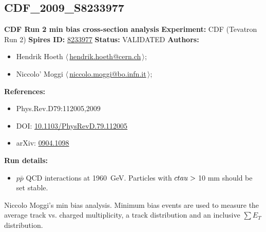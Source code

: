 \subsection[CDF\_2009\_S8233977]{CDF\_2009\_S8233977\,\cite{Aaltonen:2009ne}}
\textbf{CDF Run 2 min bias cross-section analysis}\newline
\textbf{Experiment:} CDF (Tevatron Run 2) \newline
\textbf{Spires ID:} \href{http://www.slac.stanford.edu/spires/find/hep/www?rawcmd=key+8233977}{8233977}\newline
\textbf{Status:} VALIDATED\newline
\textbf{Authors:}
\begin{itemize}
  \item Hendrik Hoeth $\langle\,$\href{mailto:hendrik.hoeth@cern.ch}{hendrik.hoeth@cern.ch}$\,\rangle$;
  \item Niccolo' Moggi $\langle\,$\href{mailto:niccolo.moggi@bo.infn.it}{niccolo.moggi@bo.infn.it}$\,\rangle$;
\end{itemize}
\textbf{References:}
\begin{itemize}
  \item Phys.Rev.D79:112005,2009
  \item DOI: \href{http://dx.doi.org/10.1103/PhysRevD.79.112005}{10.1103/PhysRevD.79.112005}
  \item arXiv: \href{http://arxiv.org/abs/0904.1098}{0904.1098}
\end{itemize}
\textbf{Run details:}
\begin{itemize}

  \item $p\bar{p}$ QCD interactions at 1960~GeV. Particles with $c \\tau > {}$10 mm  should be set stable.\end{itemize}

\noindent Niccolo Moggi's min bias analysis. Minimum bias events are used to measure the average track \pT vs. charged multiplicity, a track \pT distribution and an inclusive $\sum E_T$ distribution.

\clearpage


\clearpage

